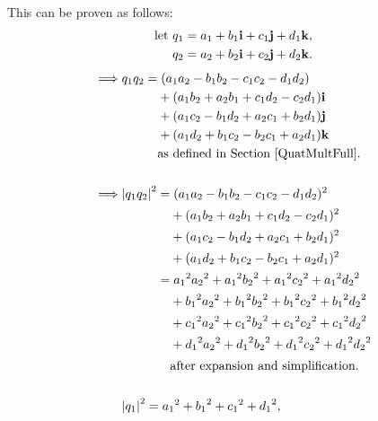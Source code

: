 \documentclass[10pt]{article}
\begin{document}
This can be proven as follows:
\begingroup
\allowdisplaybreaks
\begin{equation}
    \begin{aligned}
        \text{let } & q_1 = a_1 + b_1\vb{i} + c_1\vb{j} + d_1\vb{k}, \\
        & q_2 = a_2 + b_2\vb{i} + c_2\vb{j} + d_2\vb{k}. \\
    \end{aligned}
\end{equation}
\begin{alignat}{2}
    \implies & q_1q_2 = (a_1a_2 - b_1b_2 - c_1c_2 - d_1d_2) \\
             & \phantom{q_1q_2=} + (a_1b_2 + a_2b_1 + c_1d_2 - c_2d_1)\vb{i} \nonumber \\
             & \phantom{q_1q_2=} + (a_1c_2 - b_1d_2 + a_2c_1 + b_2d_1)\vb{j} \nonumber \\
             & \phantom{q_1q_2=} + (a_1d_2 + b_1c_2 - b_2c_1 + a_2d_1)\vb{k} \nonumber \\
             & \phantom{q_1q_2=} \text{as defined in Section \ref{QuatMultFull}}. \nonumber \\[15pt]
    \implies & \abs{q_1q_2}^2 = (a_1a_2 - b_1b_2 - c_1c_2 - d_1d_2)^2 \\
             & \phantom{\abs{q_1q_2}^2=} + (a_1b_2 + a_2b_1 + c_1d_2 - c_2d_1)^2 \nonumber \\
             & \phantom{\abs{q_1q_2}^2=} + (a_1c_2 - b_1d_2 + a_2c_1 + b_2d_1)^2 \nonumber \\
             & \phantom{\abs{q_1q_2}^2=} + (a_1d_2 + b_1c_2 - b_2c_1 + a_2d_1)^2 \nonumber \\
             & \phantom{\abs{q_1q_2}^2} = {a_1}^2{a_2}^2 + {a_1}^2{b_2}^2 + {a_1}^2{c_2}^2 + {a_1}^2{d_2}^2 \label{eqnq1q2-1} \\
             & \phantom{\abs{q_1q_2}^2=} + {b_1}^2{a_2}^2 + {b_1}^2{b_2}^2 + {b_1}^2{c_2}^2 + {b_1}^2{d_2}^2 \nonumber \\
             & \phantom{\abs{q_1q_2}^2=} + {c_1}^2{a_2}^2 + {c_1}^2{b_2}^2 + {c_1}^2{c_2}^2 + {c_1}^2{d_2}^2 \nonumber \\
             & \phantom{\abs{q_1q_2}^2=} + {d_1}^2{a_2}^2 + {d_1}^2{b_2}^2 + {d_1}^2{c_2}^2 + {d_1}^2{d_2}^2 \nonumber \\
             & \phantom{\abs{q_1q_2}^2=} \text{after expansion and simplification.} \\[15pt]
    & \abs{q_1}^2 = {a_1}^2 + {b_1}^2 + {c_1}^2 + {d_1}^2, \\

\end{alignat}
\end{document}
